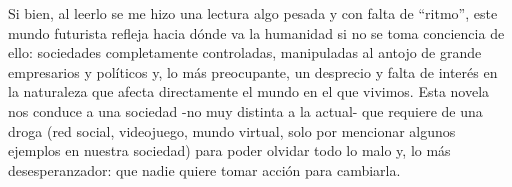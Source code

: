 \documentclass[letterpaper,12pt]{article} %
\begin{document}
	\hfill \break
	Si bien, al leerlo se me hizo una lectura algo pesada y con falta de “ritmo”, este mundo futurista refleja hacia dónde va la humanidad si no se toma conciencia de ello: sociedades completamente controladas, manipuladas al antojo de grande empresarios y políticos y, lo más preocupante, un desprecio y falta de interés en la naturaleza que afecta directamente el mundo en el que vivimos. Esta novela nos conduce a una sociedad -no muy distinta a la actual- que requiere de una droga (red social, videojuego, mundo virtual, solo por mencionar algunos ejemplos en nuestra sociedad) para poder olvidar todo lo malo y, lo más desesperanzador: que nadie quiere tomar acción para cambiarla.
\end{document}
